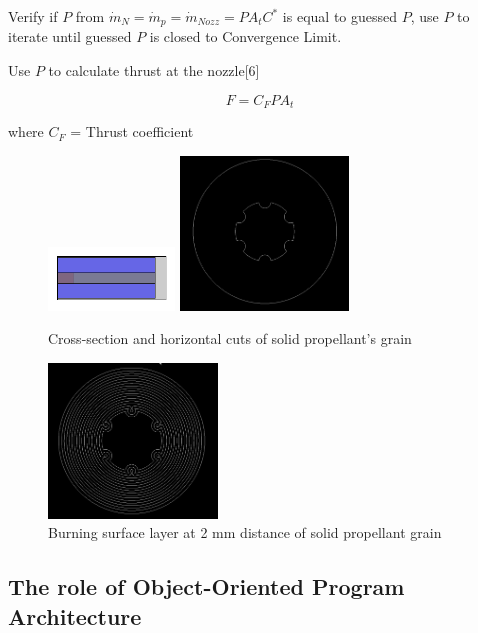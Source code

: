 \documentclass[conference]{IEEEtran}
\begin{document}
Verify if $P$ from $\dot{m}_{N} = \dot{m}_{p}= \dot{m}_{Nozz}= P{A}_tC^{*}$ is equal to guessed $P$, use $P$ to iterate until guessed $P$ is closed to Convergence Limit.

Use $P$ to calculate thrust at the nozzle[6] 
	
\begin{center}
\begin{equation}
F={C}_FP{A}_t
\end{equation}
\end{center}
where ${C}_F$ = Thrust coefficient


\begin{figure}[t]
\centering
\includegraphics[width=0.3\textwidth]{horizontal_cut}
\includegraphics[width=0.4\textwidth]{cross_section}
\caption{Cross-section and horizontal cuts of solid propellant's grain}
\label{fig:1}
\end{figure}

\begin{figure}[t]
\centering
\includegraphics[width=0.4\textwidth]{burnlayer}
\caption{Burning surface layer at 2 mm distance of solid propellant grain}
\label{fig:2}
\end{figure}

\subsection{The role of Object-Oriented Program Architecture}
\end{document}
